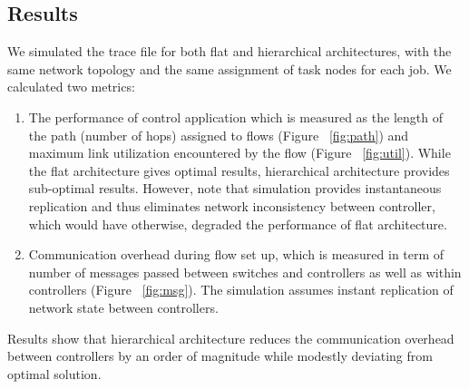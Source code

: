 \documentclass[10pt, twocolumn]{article}
\begin{document}
\subsection{Results}
\label{subsec:results}
We simulated the trace file for both flat and hierarchical architectures, with the same network topology and the same assignment of task nodes for each job. We calculated two metrics:
\begin{enumerate}
    \item The performance of control application which is measured as the length of the path (number of hops) assigned to flows (Figure ~\ref{fig:path}) and maximum link utilization encountered by the flow (Figure ~\ref{fig:util}). While the flat architecture gives optimal results, hierarchical architecture provides sub-optimal results. However, note that simulation provides instantaneous replication and thus eliminates network inconsistency between controller, which would  have otherwise, degraded the performance of flat architecture.
    \item Communication overhead during flow set up, which is measured in term of number of messages passed between switches and controllers as well as within controllers (Figure ~\ref{fig:msg}). The simulation assumes instant replication of network state between controllers.
\end{enumerate}
Results show that hierarchical architecture reduces the communication overhead between controllers by an order of magnitude while modestly deviating from optimal solution.
\end{document}
